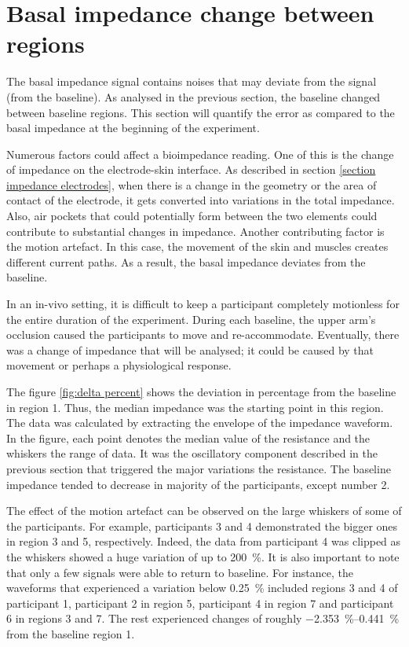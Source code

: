 \section{Basal impedance change between regions}
\label{senction basal 3.1} 
The basal impedance signal contains noises that may deviate from the signal (from the baseline). As analysed in the previous section, the baseline changed between baseline regions. This section will quantify the error as compared to the basal impedance at the beginning of the experiment. 

Numerous factors could affect a bioimpedance reading. One of this is the change of impedance on the electrode-skin interface.  As described in section \ref{section impedance electrodes}, when there is a change in the geometry or the area of contact of the electrode, it gets converted into variations in the total impedance. Also, air pockets that could potentially form between the two elements could contribute to substantial changes in impedance.  Another contributing factor is the motion artefact. In this case, the movement of the skin and muscles creates different current paths. As a result, the basal impedance deviates from the baseline. 

In an in-vivo setting, it is difficult to keep a participant completely motionless for the entire duration of the experiment.  During each baseline, the upper arm's occlusion caused the participants to move and re-accommodate. Eventually, there was a change of impedance that will be analysed; it could be caused by that movement or perhaps a physiological response. 

The figure \ref{fig:delta percent} shows the deviation in percentage from the baseline in region 1.  Thus, the median impedance was the starting point in this region. The data was calculated by extracting the envelope of the impedance waveform. In the figure, each point denotes the median value of the resistance and the whiskers the range of data. It was the oscillatory component described in the previous section that triggered the major variations the resistance. The baseline impedance tended to decrease in majority of the participants, except number 2. 

The effect of the motion artefact can be observed on the large whiskers of some of the participants. For example, participants 3 and 4 demonstrated the bigger ones in region 3 and 5, respectively. Indeed, the data from participant 4 was clipped as the whiskers showed a huge variation of up to \SI{200}{\percent}. It is also important to note that only a few signals were able to return to baseline. For instance, the waveforms that experienced a variation below \SI{0.25}{\percent} included regions 3 and 4 of participant 1, participant 2 in region 5, participant 4 in region 7 and participant 6 in regions 3 and 7. The rest experienced changes of roughly \SIrange{-2.353}{0.441}{\percent} from the baseline region 1. 


